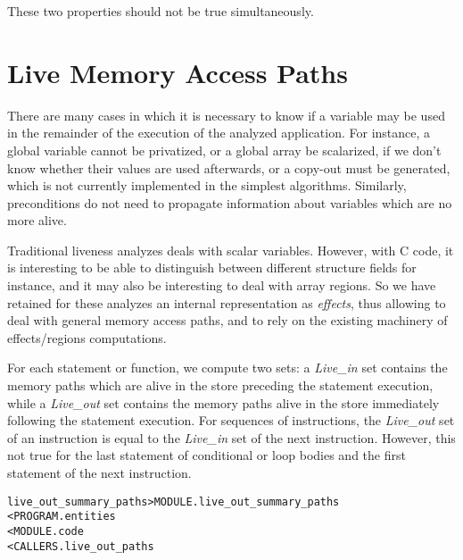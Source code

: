 \documentclass[a4paper]{report}
\newenvironment{PipsMake}{\begin{alltt}}{\end{alltt}}
\newenvironment{PipsPass}[1]{\label{pass:#1}}{}
\begin{document}
These two properties should not be true simultaneously.

\section{Live Memory Access Paths}
\label{subsection-live-memory-paths}

There are many cases in which it is necessary to know if a variable
may be used in the remainder of the execution of the analyzed
application. For instance, a global variable cannot be privatized, or
a global array be scalarized, if we don't know whether their values
are used afterwards, or a copy-out must be generated, which is not
currently implemented in the simplest algorithms. Similarly,
preconditions do not need to propagate information about variables
which are no more alive.

Traditional liveness analyzes deals with scalar variables. However,
with C code, it is interesting to be able to distinguish between
different structure fields for instance, and it may also be
interesting to deal with array regions. So we have retained for these
analyzes an internal representation as \emph{effects}, thus allowing
to deal with general memory access paths, and to rely on the existing
machinery of effects/regions computations.

For each statement or function, we compute two sets: a \emph{Live\_in}
set contains the memory paths which are alive in the store preceding
the statement execution, while a \emph{Live\_out} set contains the
memory paths alive in the store immediately following the statement
execution. For sequences of instructions, the \emph{Live\_out} set of
an instruction is equal to the \emph{Live\_in} set of the next
instruction. However, this not true for the last statement of
conditional or loop bodies and the first statement of the next
instruction.

\begin{PipsPass}{live_out_summary_paths}
\end{PipsPass}

\begin{PipsMake}
live_out_summary_paths     > MODULE.live_out_summary_paths
        < PROGRAM.entities
        < MODULE.code
        < CALLERS.live_out_paths
\end{PipsMake}


\begin{PipsPass}{live_paths}
\end{PipsPass}
\end{document}
